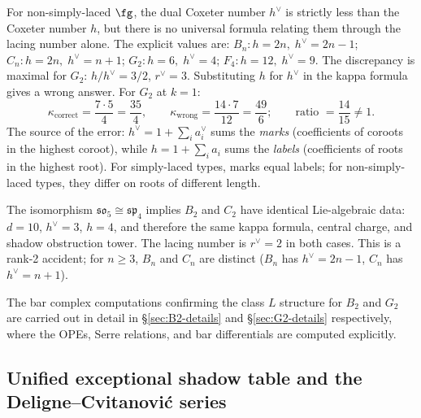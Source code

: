 \begin{remark}%
\label{rem:nsl-h-vs-h-dual}
For non-simply-laced $\fg$, the dual Coxeter number $h^\vee$
is strictly less than the Coxeter number $h$, but there is no
universal formula relating them through the lacing number
alone. The explicit values are:
$B_n\colon h = 2n,\; h^\vee = 2n{-}1$;\quad
$C_n\colon h = 2n,\; h^\vee = n{+}1$;\quad
$G_2\colon h = 6,\; h^\vee = 4$;\quad
$F_4\colon h = 12,\; h^\vee = 9$.
The discrepancy is maximal
for $G_2$: $h/h^\vee = 3/2$, $r^\vee = 3$.
Substituting $h$ for $h^\vee$ in the kappa formula gives a
wrong answer. For $G_2$ at $k = 1$:
\[
\kappa_{\text{correct}} = \frac{7 \cdot 5}{4} = \frac{35}{4},
\qquad
\kappa_{\text{wrong}} = \frac{14 \cdot 7}{12} = \frac{49}{6};
\qquad
\text{ratio } = \frac{14}{15} \neq 1.
\]
The source of the error: $h^\vee = 1 + \sum_i a_i^\vee$ sums
the \emph{marks} (coefficients of coroots in the highest coroot),
while $h = 1 + \sum_i a_i$ sums the \emph{labels} (coefficients
of roots in the highest root). For simply-laced types, marks
equal labels; for non-simply-laced types, they differ on roots of
different length.
\end{remark}

\begin{remark}%
\label{rem:b2-c2-isomorphism}
The isomorphism $\mathfrak{so}_5 \cong \mathfrak{sp}_4$ implies
$B_2$ and $C_2$ have identical Lie-algebraic data: $d = 10$,
$h^\vee = 3$, $h = 4$, and therefore the same kappa formula,
central charge, and shadow obstruction tower. The lacing number is $r^\vee = 2$
in both cases. This is a rank-2 accident; for $n \geq 3$,
$B_n$ and $C_n$ are distinct ($B_n$ has $h^\vee = 2n-1$,
$C_n$ has $h^\vee = n+1$).

The bar complex computations confirming the class $L$ structure
for $B_2$ and $G_2$ are carried out in detail in
\S\ref{sec:B2-details} and \S\ref{sec:G2-details} respectively,
where the OPEs, Serre relations, and bar differentials are
computed explicitly.
\end{remark}


\subsection{Unified exceptional shadow table and the Deligne--Cvitanovi\'c series}%
\label{subsec:unified-exceptional-table}


